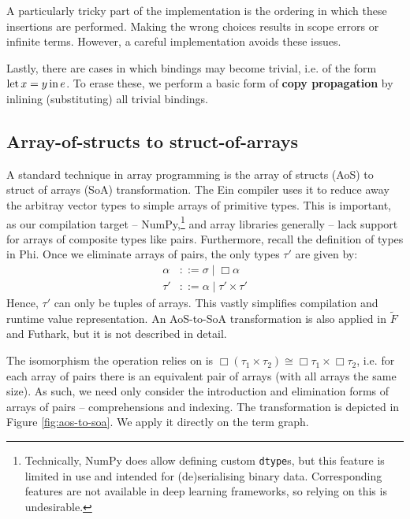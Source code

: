A particularly tricky part of the implementation is the ordering in which these insertions are performed. Making the wrong choices results in scope errors or infinite terms. However, a careful implementation avoids these issues. 

Lastly, there are cases in which bindings may become trivial, i.e. of the form $\mathrm{let}\,{x}={y}\,\mathrm{in}\,{e}$. To erase these, we perform a basic form of \textbf{copy propagation} by inlining (substituting) all trivial bindings.

\subsection{Array-of-structs to struct-of-arrays}

A standard technique in array programming is the array of structs (AoS) to struct of arrays (SoA) transformation. The Ein compiler uses it to reduce away the arbitray vector types to simple arrays of primitive types. This is important, as our compilation target -- NumPy,\footnote{Technically, NumPy does allow defining custom \texttt{dtype}s, but this feature is limited in use and intended for (de)serialising binary data. Corresponding features are not available in deep learning frameworks, so relying on this is undesirable.} and array libraries generally -- lack support for arrays of composite types like pairs. Furthermore, recall the definition of types in Phi. Once we eliminate arrays of pairs, the only types $\tau'$ are given by:
\begin{align*}
\alpha &::= \sigma \mid \Box \alpha \\
\tau' &::= \alpha \mid \tau' \times \tau'
\end{align*}
Hence, $\tau'$ can only be tuples of arrays. This vastly simplifies compilation and runtime value representation. An AoS-to-SoA transformation is also applied in $\tilde F$ and Futhark, but it is not described in detail. 

The isomorphism the operation relies on is $\Box (\tau_1 \times \tau_2) \cong \Box \tau_1 \times \Box \tau_2$, i.e. for each array of pairs there is an equivalent pair of arrays (with all arrays the same size). As such, we need only consider the introduction and elimination forms of arrays of pairs -- comprehensions and indexing. The transformation is depicted in Figure \ref{fig:aos-to-soa}. We apply it directly on the term graph. 

\newcommand{\phisoa}[1]{\mathcal S \left\llbracket {#1} \right\rrbracket}
\newcommand{\phitupleindex}[2]{\mathcal P \left\llbracket {#1}, {#2} \right\rrbracket}

